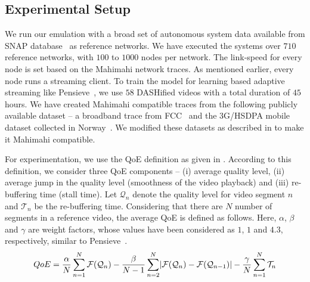 \subsection{Experimental Setup}
We run our emulation with a broad set of autonomous system data available from \ac{SNAP} database~\cite{ASDataSet} as reference networks. We have executed the systems over $710$ reference networks, with $100$ to $1000$ nodes per network. The link-speed for every node is set based on the Mahimahi network traces. As mentioned earlier, every node runs a streaming client. To train the model for learning based adaptive streaming like Pensieve~\cite{mao2017neural}, we use $58$ DASHified videos with a total duration of $45$ hours.
We have created Mahimahi compatible traces from the following publicly available dataset -- a broadband trace from FCC~\cite{dataset-fcc} and the 3G/HSDPA mobile dataset collected in Norway~\cite{dataset-norway}. We modified these datasets as described in \cite{mao2017neural} to make it Mahimahi compatible.

For experimentation, we use the \ac{QoE} definition as given in \cite{mao2017neural}. According to this definition, we consider three \ac{QoE} components -- (i) average quality level, (ii) average jump in the quality level (smoothness of the video playback) and (iii) re-buffering time (stall time). Let $\mathcal{Q}_n$ denote the quality level for video segment $n$ and $\mathcal{T}_n$ be the re-buffering time. Considering that there are $N$ number of segments in a reference video, the average \ac{QoE} is defined as follows. Here, $\alpha$, $\beta$ and $\gamma$ are weight factors, whose values have been considered as $1$, $1$ and $4.3$, respectively, similar to Pensieve~\cite{mao2017neural}.
\begin{equation}
\scriptsize
QoE = \frac{\alpha}{N}\sum_{n=1}^{N} \mathcal{F}(\mathcal{Q}_n) - \frac{\beta}{N-1} \sum_{n=2}^{N}\lvert\mathcal{F}(\mathcal{Q}_n) -\mathcal{F}(\mathcal{Q}_{n-1})\rvert - \frac{\gamma}{N}\sum_{n=1}^{N}\mathcal{T}_n
\label{eqn:chap06:QoE}
\end{equation}

